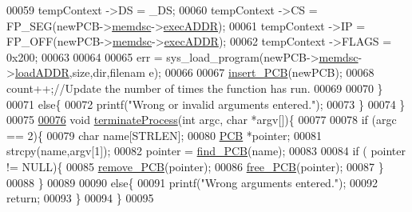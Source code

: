 \begin{DoxyCode}
00059                 tempContext ->DS = \_DS;
00060                 tempContext ->CS = FP\_SEG(newPCB->\hyperlink{structprocess_a163551ab7b60184b48e5d440fcd5c2b8}{memdsc}->\hyperlink{structmem_a5340491e17307817e6dca3b1d260d18a}{execADDR});
00061                 tempContext ->IP = FP\_OFF(newPCB->\hyperlink{structprocess_a163551ab7b60184b48e5d440fcd5c2b8}{memdsc}->\hyperlink{structmem_a5340491e17307817e6dca3b1d260d18a}{execADDR});
00062                 tempContext ->FLAGS = 0x200;
00063                 
00064                 
00065                  err = sys\_load\_program(newPCB->\hyperlink{structprocess_a163551ab7b60184b48e5d440fcd5c2b8}{memdsc}->\hyperlink{structmem_a8f5a4db03ee0560e6bd4dd602ad753c0}{loadADDR},size,dir,filenam
      e);
00066                 
00067                 \hyperlink{mpx__r2_8c_aa3b334e3a5afd6e590917667ad359a6f}{insert_PCB}(newPCB);     
00068                 count++;\textcolor{comment}{//Update the number of times the function has run.}
00069                 
00070         \}
00071         \textcolor{keywordflow}{else}\{
00072                 printf(\textcolor{stringliteral}{"Wrong or invalid arguments entered."});
00073         \}
00074 \}
00075 
\hypertarget{mpx__r4_8c_8_r_e_m_o_t_e_8c_source_l00076}{}\hyperlink{mpx__r4_8c_8_r_e_m_o_t_e_8c_aaa714b85ce262f949d018430daf6da00}{00076} \textcolor{keywordtype}{void} \hyperlink{mpx__r4_8c_aaa714b85ce262f949d018430daf6da00}{terminateProcess}(\textcolor{keywordtype}{int} argc, \textcolor{keywordtype}{char} *argv[])\{
00077 
00078         \textcolor{keywordflow}{if} (argc == 2)\{
00079                 \textcolor{keywordtype}{char} name[STRLEN];
00080                 \hyperlink{structprocess}{PCB} *pointer;
00081                 strcpy(name,argv[1]);
00082                 pointer = \hyperlink{mpx__r2_8c_a612a6abcb66c688a32f33abc93ff3990}{find_PCB}(name);
00083         
00084                 \textcolor{keywordflow}{if} ( pointer != NULL)\{
00085                         \hyperlink{mpx__r2_8c_af30a3658210d449b4b53e5be2ed2bc2e}{remove_PCB}(pointer);
00086                         \hyperlink{mpx__r2_8c_a79890f055b1d0fccf1962bbde4877caa}{free_PCB}(pointer);
00087                 \}
00088         \}
00089         
00090         \textcolor{keywordflow}{else}\{
00091                 printf(\textcolor{stringliteral}{"Wrong arguments entered."});
00092                 \textcolor{keywordflow}{return};
00093         \}
00094 \}
00095 
\end{DoxyCode}
